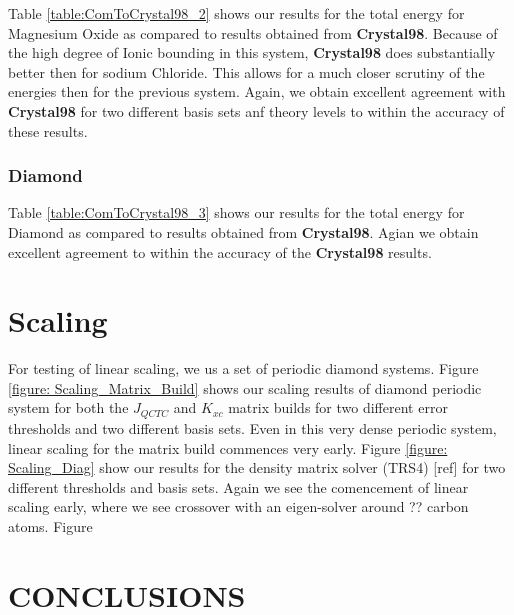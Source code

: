 \commentoutA{\documentclass[prb,aps,twocolumn,showpacs,twocolumngrid,superbib]{revtex4}}
\begin{document}
Table \ref{table:ComToCrystal98_2} shows our results for the total
energy for Magnesium Oxide as compared to results obtained from \textbf{Crystal98}.
Because of the high degree of Ionic bounding in this system, \textbf{Crystal98}
does substantially better then for sodium Chloride. This allows for
a much closer scrutiny of the energies then for the previous system.
Again, we obtain excellent agreement with \textbf{Crystal98} for two
different basis sets anf theory levels to within the accuracy of these
results.


\subsubsection{Diamond}

Table \ref{table:ComToCrystal98_3} shows our results for the total
energy for Diamond as compared to results obtained from \textbf{Crystal98}.
Agian we obtain excellent agreement to within the accuracy of the
\textbf{Crystal98} results.


\section{Scaling}

For testing of linear scaling, we us a set of periodic diamond systems.
Figure \ref{figure: Scaling_Matrix_Build} shows our scaling results
of diamond periodic system for both the \( J_{QCTC} \) and \( K_{xc} \)
matrix builds for two different error thresholds and two different
basis sets. Even in this very dense periodic system, linear scaling
for the matrix build commences very early. Figure \ref{figure: Scaling_Diag}
show our results for the density matrix solver (TRS4) {[}ref{]} for
two different thresholds and basis sets. Again we see the comencement
of linear scaling early, where we see crossover with an eigen-solver
around ?? carbon atoms. Figure 


\section{CONCLUSIONS}
\end{document}
